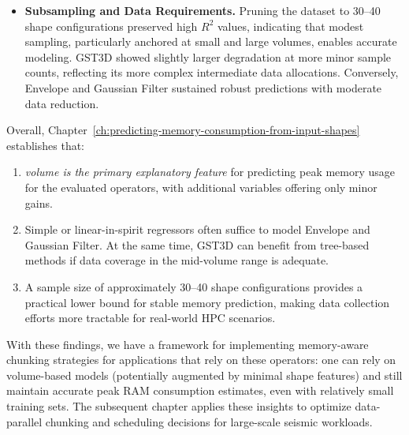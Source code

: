 \begin{itemize}
    \item \textbf{Subsampling and Data Requirements.}
    Pruning the dataset to 30–40 shape configurations preserved high $R^2$ values, indicating that modest sampling, particularly anchored at small and large volumes, enables accurate modeling.
    \ac{GST3D} showed slightly larger degradation at more minor sample counts, reflecting its more complex intermediate data allocations.
    Conversely, Envelope and Gaussian Filter sustained robust predictions with moderate data reduction.
\end{itemize}

Overall, Chapter~\ref{ch:predicting-memory-consumption-from-input-shapes} establishes that:
\begin{enumerate}
    \item \emph{volume is the primary explanatory feature} for predicting peak memory usage for the evaluated operators, with additional variables offering only minor gains.
    \item Simple or linear-in-spirit regressors often suffice to model Envelope and Gaussian Filter. At the same time, \ac{GST3D} can benefit from tree-based methods if data coverage in the mid-volume range is adequate.
    \item A sample size of approximately 30–40 shape configurations provides a practical lower bound for stable memory prediction, making data collection efforts more tractable for real-world \ac{HPC} scenarios.
\end{enumerate}

With these findings, we have a framework for implementing memory-aware chunking strategies for applications that rely on these operators: one can rely on volume-based models (potentially augmented by minimal shape features) and still maintain accurate peak \ac{RAM} consumption estimates, even with relatively small training sets.
The subsequent chapter applies these insights to optimize data-parallel chunking and scheduling decisions for large-scale seismic workloads.